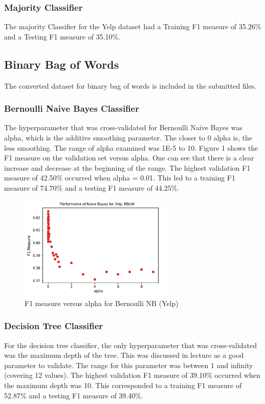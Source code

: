 \documentclass[11pt]{article}
\begin{document}
\subsubsection{Majority Classifier}
The majority Classifier for the Yelp dataset had a Training F1 measure of 35.26\% and a Testing F1 measure of 35.10\%.

\subsection{Binary Bag of Words}
The converted dataset for binary bag of words is included in the submitted files.

\subsubsection{Bernoulli Naive Bayes Classifier}
The hyperparameter that was cross-validated for Bernoulli Naive Bayes was alpha, which is the additive smoothing parameter. The closer to 0 alpha is, the less smoothing. The range of alpha examined was 1E-5 to 10. Figure 1 shows the F1 measure on the validation set versus alpha. One can see that there is a clear increase and decrease at the beginning of the range. The highest validation F1 measure of 42.50\% occurred when alpha = 0.01. This led to a training F1 measure of 74.70\% and a testing F1 measure of 44.25\%.

\begin{figure}[ht]
\centering
\includegraphics[width=0.65\textwidth]{Yelp_BernoulliNB}
\caption{F1 measure versus alpha for Bernoulli NB (Yelp)}
\end{figure}

\subsubsection{Decision Tree Classifier}
For the decision tree classifier, the only hyperparameter that was cross-validated was the maximum depth of the tree. This was discussed in lecture as a good parameter to validate. The range for this parameter was between 1 and infinity (covering 12 values). The highest validation F1 measure of 39.10\% occurred when the maximum depth was 10. This corresponded to a training F1 measure of 52.87\% and a testing F1 measure of 39.40\%.\\
\end{document}
